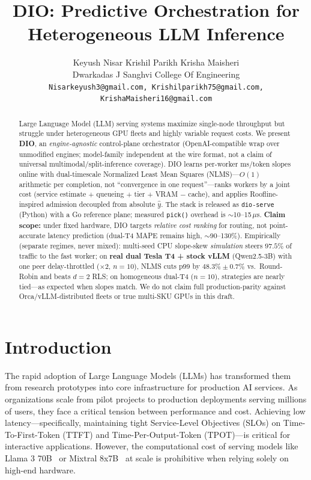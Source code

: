 \documentclass[10pt,twocolumn,letterpaper]{article}
\title{DIO: Predictive Orchestration for Heterogeneous LLM Inference}
\author{
    Keyush Nisar \qquad Krishil Parikh \qquad Krisha Maisheri \\
    Dwarkadas J Sanghvi College Of Engineering \\
    {\tt\small Nisarkeyush3@gmail.com, Krishilparikh75@gmail.com, KrishaMaisheri16@gmail.com}
}
\begin{document}
\maketitle

\begin{abstract}
Large Language Model (LLM) serving systems maximize single-node throughput but struggle under heterogeneous GPU fleets and highly variable request costs. We present \textbf{DIO}, an \emph{engine-agnostic} control-plane orchestrator (OpenAI-compatible wrap over unmodified engines; model-family independent at the wire format, not a claim of universal multimodal/split-inference coverage). DIO learns per-worker ms/token slopes online with dual-timescale Normalized Least Mean Squares (NLMS)---$O(1)$ arithmetic per completion, not ``convergence in one request''---ranks workers by a joint cost (service estimate $+$ queueing $+$ tier $+$ VRAM $-$ cache), and applies Roofline-inspired admission decoupled from absolute $\hat{y}$. The stack is released as \texttt{dio-serve} (Python) with a Go reference plane; measured \texttt{pick()} overhead is $\sim$10--15\,$\mu$s. \textbf{Claim scope:} under fixed hardware, DIO targets \emph{relative cost ranking} for routing, not point-accurate latency prediction (dual-T4 MAPE remains high, $\sim$90--130\%). Empirically (separate regimes, never mixed): multi-seed CPU slope-skew \emph{simulation} steers $97.5\%$ of traffic to the fast worker; on \textbf{real dual Tesla T4 + stock vLLM} (Qwen2.5-3B) with one peer delay-throttled ($\times 2$, $n{=}10$), NLMS cuts p99 by $48.3\%\pm0.7\%$ vs.\ Round-Robin and beats $d{=}2$ RLS; on homogeneous dual-T4 ($n{=}10$), strategies are nearly tied---as expected when slopes match. We do not claim full production-parity against Orca/vLLM-distributed fleets or true multi-SKU GPUs in this draft.
\end{abstract}

\section{Introduction}
\label{sec:intro}

The rapid adoption of Large Language Models (LLMs) has transformed them from research prototypes into core infrastructure for production AI services. As organizations scale from pilot projects to production deployments serving millions of users, they face a critical tension between performance and cost. Achieving low latency---specifically, maintaining tight Service-Level Objectives (SLOs) on Time-To-First-Token (TTFT) and Time-Per-Output-Token (TPOT)---is critical for interactive applications. However, the computational cost of serving models like Llama 3 70B~\cite{meta2024llama3} or Mixtral 8x7B~\cite{jiang2023mixtral} at scale is prohibitive when relying solely on high-end hardware.
\end{document}
